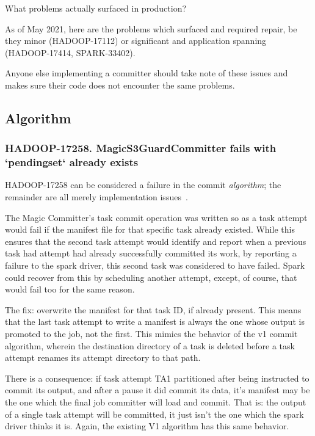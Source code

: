 \documentclass[conference]{IEEEtran}
\begin{document}
What problems actually surfaced in production?

As of May 2021, here are the problems which surfaced
and required repair, be they minor (HADOOP-17112) or
significant and application spanning (HADOOP-17414, SPARK-33402).

Anyone else implementing a committer should take note of
these issues and makes sure their code does not encounter
the same problems.

\subsection{Algorithm}
\label{subsec:algorithm}

\subsubsection{HADOOP-17258. MagicS3GuardCommitter fails with `pendingset` already exists}


HADOOP-17258 can be considered a failure in the commit \emph{algorithm};
the remainder are all merely implementation issues\ \cite{HADOOP-17258}.

The Magic Committer's task commit operation was written so as
a task attempt would fail if the manifest file for that specific task already existed.
While this ensures that the second task attempt would identify and report when a previous
task had attempt had already successfully committed its work, by reporting a failure
to the spark driver, this second task was considered to have failed.
Spark could recover from this by scheduling another attempt, except, of course,
that would fail too for the same reason.

The fix: overwrite the manifest for that task ID, if already present.
This means that the last task attempt to write a manifest is always the one
whose output is promoted to the job, not the first.
This mimics the behavior of the v1 commit algorithm, wherein the destination directory
of a task is deleted before a task attempt renames its attempt directory to that path.

There is a consequence: if task attempt TA1 partitioned after being instructed
to commit its output, and after a pause it did commit its data, it's manifest
may be the one which the final job committer will load and commit.
That is: the output of a single task attempt will be committed, it just
isn't the one which the spark driver thinks it is.
Again, the existing V1 algorithm has this same behavior.
\end{document}
